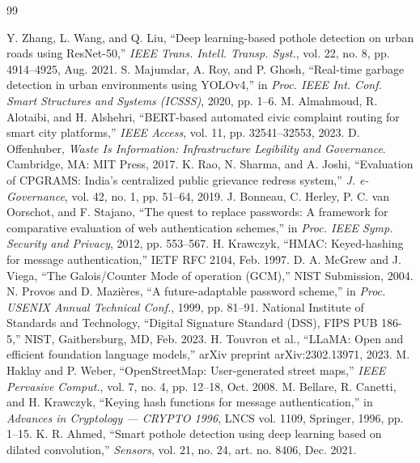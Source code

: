 \documentclass[conference]{IEEEtran}
\begin{document}
\begin{thebibliography}{99}

 Y. Zhang, L. Wang, and Q. Liu, ``Deep learning-based pothole detection on urban roads using ResNet-50,'' \emph{IEEE Trans. Intell. Transp. Syst.}, vol. 22, no. 8, pp. 4914--4925, Aug. 2021.
 S. Majumdar, A. Roy, and P. Ghosh, ``Real-time garbage detection in urban environments using YOLOv4,'' in \emph{Proc. IEEE Int. Conf. Smart Structures and Systems (ICSSS)}, 2020, pp. 1--6.
 M. Almahmoud, R. Alotaibi, and H. Alshehri, ``BERT-based automated civic complaint routing for smart city platforms,'' \emph{IEEE Access}, vol. 11, pp. 32541--32553, 2023.
 D. Offenhuber, \emph{Waste Is Information: Infrastructure Legibility and Governance}. Cambridge, MA: MIT Press, 2017.
 K. Rao, N. Sharma, and A. Joshi, ``Evaluation of CPGRAMS: India's centralized public grievance redress system,'' \emph{J. e-Governance}, vol. 42, no. 1, pp. 51--64, 2019.
 J. Bonneau, C. Herley, P. C. van Oorschot, and F. Stajano, ``The quest to replace passwords: A framework for comparative evaluation of web authentication schemes,'' in \emph{Proc. IEEE Symp. Security and Privacy}, 2012, pp. 553--567.
 H. Krawczyk, ``HMAC: Keyed-hashing for message authentication,'' IETF RFC 2104, Feb. 1997.
 D. A. McGrew and J. Viega, ``The Galois/Counter Mode of operation (GCM),'' NIST Submission, 2004.
 N. Provos and D. Mazi\`eres, ``A future-adaptable password scheme,'' in \emph{Proc. USENIX Annual Technical Conf.}, 1999, pp. 81--91.
 National Institute of Standards and Technology, ``Digital Signature Standard (DSS), FIPS PUB 186-5,'' NIST, Gaithersburg, MD, Feb. 2023.
 H. Touvron et al., ``LLaMA: Open and efficient foundation language models,'' arXiv preprint arXiv:2302.13971, 2023.
 M. Haklay and P. Weber, ``OpenStreetMap: User-generated street maps,'' \emph{IEEE Pervasive Comput.}, vol. 7, no. 4, pp. 12--18, Oct. 2008.
 M. Bellare, R. Canetti, and H. Krawczyk, ``Keying hash functions for message authentication,'' in \emph{Advances in Cryptology --- CRYPTO 1996}, LNCS vol. 1109, Springer, 1996, pp. 1--15.
 K. R. Ahmed, ``Smart pothole detection using deep learning based on dilated convolution,'' \emph{Sensors}, vol. 21, no. 24, art. no. 8406, Dec. 2021.

\end{thebibliography}
\end{document}
